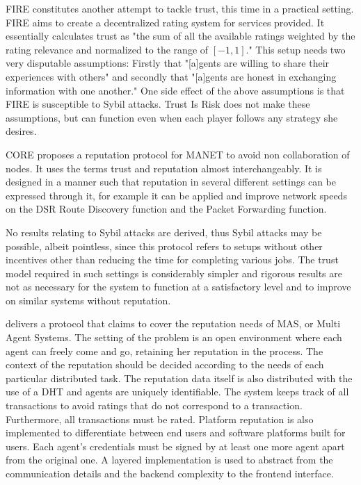   FIRE \cite{fire} constitutes another attempt to tackle trust, this time in a practical setting. FIRE aims to create a
  decentralized rating system for services provided. It essentially calculates trust as "the sum of all the available ratings
  weighted by the rating relevance and normalized to the range of $\left[-1, 1\right]$." This setup needs two very disputable
  assumptions: Firstly that "[a]gents are willing to share their experiences with others" and secondly that "[a]gents are
  honest in exchanging information with one another." One side effect of the above assumptions is that FIRE is susceptible to
  Sybil attacks. Trust Is Risk does not make these assumptions, but can function even when each player follows any strategy
  she desires.

  CORE \cite{core} proposes a reputation protocol for MANET to avoid non collaboration of nodes. It uses the terms trust and
  reputation almost interchangeably. It is designed in a manner such that reputation in several different settings can be
  expressed through it, for example it can be applied and improve network speeds on the DSR Route Discovery function and the
  Packet Forwarding function.

  No results relating to Sybil attacks are derived, thus Sybil attacks may be possible, albeit pointless, since this protocol
  refers to setups without other incentives other than reducing the time for completing various jobs. The trust model
  required in such settings is considerably simpler and rigorous results are not as necessary for the system to function at a
  satisfactory level and to improve on similar systems without reputation.

  \cite{ghkkw} delivers a protocol that claims to cover the reputation needs of MAS, or Multi Agent Systems. The setting of
  the problem is an open environment where each agent can freely come and go, retaining her reputation in the process.
  The context of the reputation should be decided according to the needs of each particular distributed task. The reputation
  data itself is also distributed with the use of a DHT and agents are uniquely identifiable. The system keeps track of all
  transactions to avoid ratings that do not correspond to a transaction. Furthermore, all transactions must be rated.
  Platform reputation is also implemented to differentiate between end users and software platforms built for users. Each
  agent's credentials must be signed by at least one more agent apart from the original one. A layered implementation is used
  to abstract from the communication details and the backend complexity to the frontend interface.

